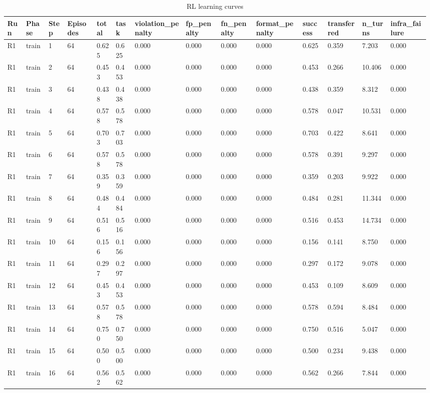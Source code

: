 \begin{table}[t]
\centering
\caption{RL learning curves}
\begin{tabular}{llllllllllllll}
\hline
Run & Phase & Step & Episodes & total & task & violation\_penalty & fp\_penalty & fn\_penalty & format\_penalty & success & transferred & n\_turns & infra\_failure \\
\hline
R1 & train & 1 & 64 & 0.625 & 0.625 & 0.000 & 0.000 & 0.000 & 0.000 & 0.625 & 0.359 & 7.203 & 0.000 \\
R1 & train & 2 & 64 & 0.453 & 0.453 & 0.000 & 0.000 & 0.000 & 0.000 & 0.453 & 0.266 & 10.406 & 0.000 \\
R1 & train & 3 & 64 & 0.438 & 0.438 & 0.000 & 0.000 & 0.000 & 0.000 & 0.438 & 0.359 & 8.312 & 0.000 \\
R1 & train & 4 & 64 & 0.578 & 0.578 & 0.000 & 0.000 & 0.000 & 0.000 & 0.578 & 0.047 & 10.531 & 0.000 \\
R1 & train & 5 & 64 & 0.703 & 0.703 & 0.000 & 0.000 & 0.000 & 0.000 & 0.703 & 0.422 & 8.641 & 0.000 \\
R1 & train & 6 & 64 & 0.578 & 0.578 & 0.000 & 0.000 & 0.000 & 0.000 & 0.578 & 0.391 & 9.297 & 0.000 \\
R1 & train & 7 & 64 & 0.359 & 0.359 & 0.000 & 0.000 & 0.000 & 0.000 & 0.359 & 0.203 & 9.922 & 0.000 \\
R1 & train & 8 & 64 & 0.484 & 0.484 & 0.000 & 0.000 & 0.000 & 0.000 & 0.484 & 0.281 & 11.344 & 0.000 \\
R1 & train & 9 & 64 & 0.516 & 0.516 & 0.000 & 0.000 & 0.000 & 0.000 & 0.516 & 0.453 & 14.734 & 0.000 \\
R1 & train & 10 & 64 & 0.156 & 0.156 & 0.000 & 0.000 & 0.000 & 0.000 & 0.156 & 0.141 & 8.750 & 0.000 \\
R1 & train & 11 & 64 & 0.297 & 0.297 & 0.000 & 0.000 & 0.000 & 0.000 & 0.297 & 0.172 & 9.078 & 0.000 \\
R1 & train & 12 & 64 & 0.453 & 0.453 & 0.000 & 0.000 & 0.000 & 0.000 & 0.453 & 0.109 & 8.609 & 0.000 \\
R1 & train & 13 & 64 & 0.578 & 0.578 & 0.000 & 0.000 & 0.000 & 0.000 & 0.578 & 0.594 & 8.484 & 0.000 \\
R1 & train & 14 & 64 & 0.750 & 0.750 & 0.000 & 0.000 & 0.000 & 0.000 & 0.750 & 0.516 & 5.047 & 0.000 \\
R1 & train & 15 & 64 & 0.500 & 0.500 & 0.000 & 0.000 & 0.000 & 0.000 & 0.500 & 0.234 & 9.438 & 0.000 \\
R1 & train & 16 & 64 & 0.562 & 0.562 & 0.000 & 0.000 & 0.000 & 0.000 & 0.562 & 0.266 & 7.844 & 0.000 \\

\end{tabular}
\end{table}
